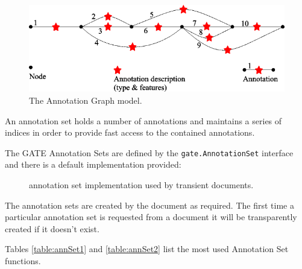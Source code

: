 \begin{figure}[htbp]
\begin{center}
\includegraphics[scale=0.5]{annotationGraph.png}
\caption{The Annotation Graph model.}
\label{fig:ann-graph}
\end{center}
\end{figure}

An annotation set holds a number of annotations and maintains a series of
indices in order to provide fast access to the contained annotations.

The GATE Annotation Sets are defined by the {\tt gate.AnnotationSet}
interface and there is a default implementation provided:

\begin{description}
%
\item[{\tt {}}]
annotation set implementation used by transient documents.
\end{description}

The annotation sets are created by the document as required. The first time
a particular annotation set is requested from a document it will be
transparently created if it doesn't exist.

Tables \ref{table:annSet1} and \ref{table:annSet2} list the most used
Annotation Set functions.

